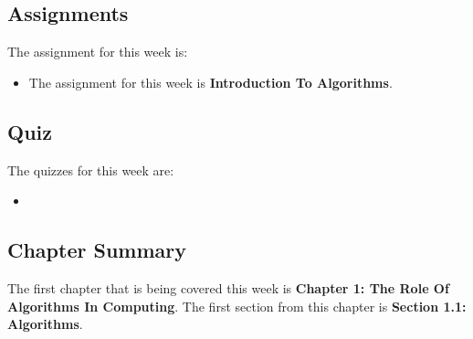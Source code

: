 \subsection{Assignments}

The assignment for this week is:

\begin{itemize}
    \item The assignment for this week is \textbf{Introduction To Algorithms}. 
\end{itemize}

\subsection{Quiz}

The quizzes for this week are:

\begin{itemize}
    \item {} \textbullet {} 
\end{itemize}

\subsection{Chapter Summary}

The first chapter that is being covered this week is \textbf{Chapter 1: The Role Of Algorithms In Computing}. The first section from this chapter is \textbf{Section 1.1: Algorithms}.

